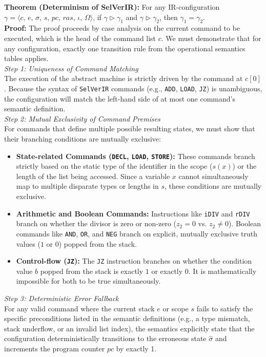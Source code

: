 \documentclass{article}
\begin{document}
\textbf{Theorem (Determinism of SelVerIR):} For any IR-configuration $\gamma = \langle c,\, e,\, \sigma,\, s,\, pc,\, ras,\, \iota,\, \Omega \rangle$, if $\gamma \triangleright \gamma_1$ and $\gamma \triangleright \gamma_2$, then $\gamma_1 = \gamma_2$. \\

\textbf{Proof:} The proof proceeds by case analysis on the current command to be executed, which is the head of the command list $c$. We must demonstrate that for any configuration, exactly one transition rule from the operational semantics tables applies. \\

\textit{Step 1: Uniqueness of Command Matching} \\
The execution of the abstract machine is strictly driven by the command at $c[0]$. Because the syntax of \texttt{SelVerIR} commands (e.g., \texttt{ADD}, \texttt{LOAD}, \texttt{JZ}) is unambiguous, the configuration will match the left-hand side of at most one command's semantic definition. \\

\textit{Step 2: Mutual Exclusivity of Command Premises} \\
For commands that define multiple possible resulting states, we must show that their branching conditions are mutually exclusive:
\begin{itemize}
    \item \textbf{State-related Commands (\texttt{DECL}, \texttt{LOAD}, \texttt{STORE}):} These commands branch strictly based on the static type of the identifier in the scope ($s(x)$) or the length of the list being accessed. Since a variable $x$ cannot simultaneously map to multiple disparate types or lengths in $s$, these conditions are mutually exclusive.
    \item \textbf{Arithmetic and Boolean Commands:} Instructions like \texttt{iDIV} and \texttt{rDIV} branch on whether the divisor is zero or non-zero ($z_2 = 0$ vs. $z_2 \neq 0$). Boolean commands like \texttt{AND}, \texttt{OR}, and \texttt{NEG} branch on explicit, mutually exclusive truth values ($1$ or $0$) popped from the stack.
    \item \textbf{Control-flow (\texttt{JZ}):} The \texttt{JZ} instruction branches on whether the condition value $b$ popped from the stack is exactly $1$ or exactly $0$. It is mathematically impossible for both to be true simultaneously.
\end{itemize}

\textit{Step 3: Deterministic Error Fallback} \\
For any valid command where the current stack $e$ or scope $s$ fails to satisfy the specific preconditions listed in the semantic definitions (e.g., a type mismatch, stack underflow, or an invalid list index), the semantics explicitly state that the configuration deterministically transitions to the erroneous state $\hat{\sigma}$ and increments the program counter $pc$ by exactly 1. \\
\end{document}
